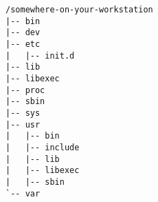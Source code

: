 {\scriptsize
\begin{verbatim}
/somewhere-on-your-workstation
|-- bin
|-- dev
|-- etc
|   |-- init.d
|-- lib
|-- libexec
|-- proc
|-- sbin
|-- sys
|-- usr
|   |-- bin
|   |-- include
|   |-- lib
|   |-- libexec
|   |-- sbin
`-- var
\end{verbatim}
}
